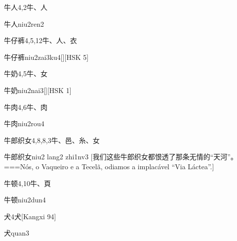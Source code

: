 \begin{Entry}{牛人}{4,2}{⽜、⼈}
  \begin{Phonetics}{牛人}{niu2ren2}
  \end{Phonetics}
\end{Entry}

\begin{Entry}{牛仔裤}{4,5,12}{⽜、⼈、⾐}
  \begin{Phonetics}{牛仔裤}{niu2zai3ku4}[][HSK 5]
  \end{Phonetics}
\end{Entry}

\begin{Entry}{牛奶}{4,5}{⽜、⼥}
  \begin{Phonetics}{牛奶}{niu2nai3}[][HSK 1]
  \end{Phonetics}
\end{Entry}

\begin{Entry}{牛肉}{4,6}{⽜、⾁}
  \begin{Phonetics}{牛肉}{niu2rou4}
  \end{Phonetics}
\end{Entry}

\begin{Entry}{牛郎织女}{4,8,8,3}{⽜、⾢、⽷、⼥}
  \begin{Phonetics}{牛郎织女}{niu2 lang2 zhi1nv3}
    [我们这些牛郎织女都恨透了那条无情的“天河”。===Nós, o Vaqueiro e a Tecelã, odiamos a implacável ``Via Láctea''.]
  \end{Phonetics}
\end{Entry}

\begin{Entry}{牛顿}{4,10}{⽜、⾴}
  \begin{Phonetics}{牛顿}{niu2dun4}
  \end{Phonetics}
\end{Entry}

\begin{Entry}{犬}{4}{⽝}[Kangxi 94]
  \begin{Phonetics}{犬}{quan3}
  \end{Phonetics}
\end{Entry}

